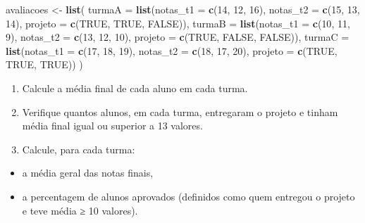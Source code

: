 \documentclass[
]{book}
\newenvironment{Shaded}{\begin{snugshade}}{\end{snugshade}}
\newcommand{\AttributeTok}[1]{\textcolor[rgb]{0.13,0.29,0.53}{#1}}
\newcommand{\ConstantTok}[1]{\textcolor[rgb]{0.56,0.35,0.01}{#1}}
\newcommand{\DecValTok}[1]{\textcolor[rgb]{0.00,0.00,0.81}{#1}}
\newcommand{\FunctionTok}[1]{\textcolor[rgb]{0.13,0.29,0.53}{\textbf{#1}}}
\newcommand{\NormalTok}[1]{#1}
\newcommand{\OtherTok}[1]{\textcolor[rgb]{0.56,0.35,0.01}{#1}}
\providecommand{\tightlist}{%
  \setlength{\itemsep}{0pt}\setlength{\parskip}{0pt}}
\begin{document}
\begin{Shaded}
\begin{Highlighting}[]
\NormalTok{avaliacoes }\OtherTok{\textless{}{-}} \FunctionTok{list}\NormalTok{(}
  \AttributeTok{turmaA =} \FunctionTok{list}\NormalTok{(}\AttributeTok{notas\_t1 =} \FunctionTok{c}\NormalTok{(}\DecValTok{14}\NormalTok{, }\DecValTok{12}\NormalTok{, }\DecValTok{16}\NormalTok{), }\AttributeTok{notas\_t2 =} \FunctionTok{c}\NormalTok{(}\DecValTok{15}\NormalTok{, }\DecValTok{13}\NormalTok{, }\DecValTok{14}\NormalTok{), }\AttributeTok{projeto =} \FunctionTok{c}\NormalTok{(}\ConstantTok{TRUE}\NormalTok{, }\ConstantTok{TRUE}\NormalTok{, }\ConstantTok{FALSE}\NormalTok{)),}
  \AttributeTok{turmaB =} \FunctionTok{list}\NormalTok{(}\AttributeTok{notas\_t1 =} \FunctionTok{c}\NormalTok{(}\DecValTok{10}\NormalTok{, }\DecValTok{11}\NormalTok{, }\DecValTok{9}\NormalTok{), }\AttributeTok{notas\_t2 =} \FunctionTok{c}\NormalTok{(}\DecValTok{13}\NormalTok{, }\DecValTok{12}\NormalTok{, }\DecValTok{10}\NormalTok{), }\AttributeTok{projeto =} \FunctionTok{c}\NormalTok{(}\ConstantTok{TRUE}\NormalTok{, }\ConstantTok{FALSE}\NormalTok{, }\ConstantTok{FALSE}\NormalTok{)),}
  \AttributeTok{turmaC =} \FunctionTok{list}\NormalTok{(}\AttributeTok{notas\_t1 =} \FunctionTok{c}\NormalTok{(}\DecValTok{17}\NormalTok{, }\DecValTok{18}\NormalTok{, }\DecValTok{19}\NormalTok{), }\AttributeTok{notas\_t2 =} \FunctionTok{c}\NormalTok{(}\DecValTok{18}\NormalTok{, }\DecValTok{17}\NormalTok{, }\DecValTok{20}\NormalTok{), }\AttributeTok{projeto =} \FunctionTok{c}\NormalTok{(}\ConstantTok{TRUE}\NormalTok{, }\ConstantTok{TRUE}\NormalTok{, }\ConstantTok{TRUE}\NormalTok{))}
\NormalTok{)}
\end{Highlighting}
\end{Shaded}

\begin{enumerate}
\def\labelenumi{(\alph{enumi})}
\item
  Calcule a média final de cada aluno em cada turma.
\item
  Verifique quantos alunos, em cada turma, entregaram o projeto e tinham média final igual ou superior a 13 valores.
\item
  Calcule, para cada turma:
\end{enumerate}

\begin{itemize}
\tightlist
\item
  a média geral das notas finais,
\item
  a percentagem de alunos aprovados (definidos como quem entregou o projeto e teve média ≥ 10 valores).
\end{itemize}
\end{document}
